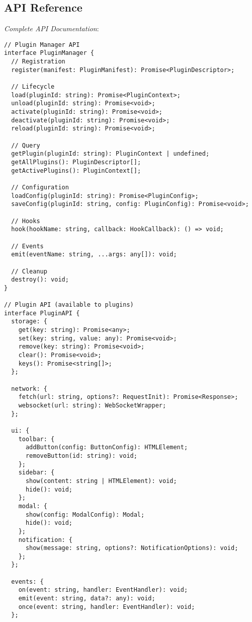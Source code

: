 \documentclass[11pt]{article}
\begin{document}
\subsection{API Reference}
\label{sec:org36fb417}

\emph{Complete API Documentation}:

\begin{verbatim}
// Plugin Manager API
interface PluginManager {
  // Registration
  register(manifest: PluginManifest): Promise<PluginDescriptor>;
  
  // Lifecycle
  load(pluginId: string): Promise<PluginContext>;
  unload(pluginId: string): Promise<void>;
  activate(pluginId: string): Promise<void>;
  deactivate(pluginId: string): Promise<void>;
  reload(pluginId: string): Promise<void>;
  
  // Query
  getPlugin(pluginId: string): PluginContext | undefined;
  getAllPlugins(): PluginDescriptor[];
  getActivePlugins(): PluginContext[];
  
  // Configuration
  loadConfig(pluginId: string): Promise<PluginConfig>;
  saveConfig(pluginId: string, config: PluginConfig): Promise<void>;
  
  // Hooks
  hook(hookName: string, callback: HookCallback): () => void;
  
  // Events
  emit(eventName: string, ...args: any[]): void;
  
  // Cleanup
  destroy(): void;
}

// Plugin API (available to plugins)
interface PluginAPI {
  storage: {
    get(key: string): Promise<any>;
    set(key: string, value: any): Promise<void>;
    remove(key: string): Promise<void>;
    clear(): Promise<void>;
    keys(): Promise<string[]>;
  };
  
  network: {
    fetch(url: string, options?: RequestInit): Promise<Response>;
    websocket(url: string): WebSocketWrapper;
  };
  
  ui: {
    toolbar: {
      addButton(config: ButtonConfig): HTMLElement;
      removeButton(id: string): void;
    };
    sidebar: {
      show(content: string | HTMLElement): void;
      hide(): void;
    };
    modal: {
      show(config: ModalConfig): Modal;
      hide(): void;
    };
    notification: {
      show(message: string, options?: NotificationOptions): void;
    };
  };
  
  events: {
    on(event: string, handler: EventHandler): void;
    emit(event: string, data?: any): void;
    once(event: string, handler: EventHandler): void;
  };
  

\end{verbatim}
\end{document}
